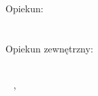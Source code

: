
{\large Opiekun:}\\[.5cm]
{\large \bfseries{\supname}}\\[.5cm]
{\departmentname}\\[1cm]


\ifdefined\supExt
    {\large Opiekun zewnętrzny:}\\[.5cm]
    {\large \bfseries{\supExt}}\\[.5cm]
    \departmentnameExt
\fi

~\vfill
\placesubmit, \yearsubmit\\

\endgroup

